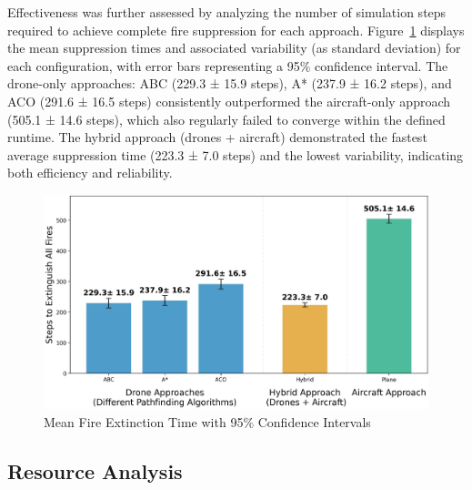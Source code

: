 \documentclass[11pt, a4paper]{article}
\begin{document}
Effectiveness was further assessed by analyzing the number of simulation steps required to achieve complete fire suppression for each approach. Figure~\ref{fig:comparitive_analysis} displays the mean suppression times and associated variability (as standard deviation) for each configuration, with error bars representing a 95\% confidence interval.
The drone-only approaches: ABC (229.3 ± 15.9 steps), A* (237.9 ± 16.2 steps), and ACO (291.6 ± 16.5 steps) consistently outperformed the aircraft-only approach (505.1 ± 14.6 steps), which also regularly failed to converge within the defined runtime. The hybrid approach (drones + aircraft) demonstrated the fastest average suppression time (223.3 ± 7.0 steps) and the lowest variability, indicating both efficiency and reliability.

\begin{figure}[htbp]
    \centering
    \includegraphics[width=1\linewidth]{figures/fire_extinction_comparison.jpeg}
    \caption{Mean Fire Extinction Time with 95\% Confidence Intervals}
    \label{fig:comparitive_analysis}
\end{figure}

\subsection{Resource Analysis}
\label{sec:resource}
\end{document}
